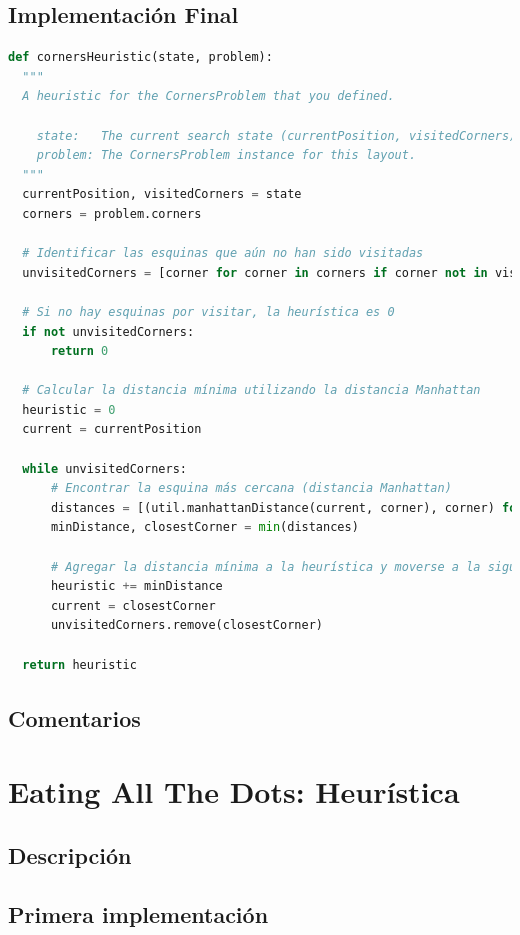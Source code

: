 \documentclass{report}
\begin{document}
        \subsection*{Implementación Final}
          \begin{lstlisting}[language=Python, caption=Implementación final de la heurística del problema de las esquinas]
def cornersHeuristic(state, problem):
  """
  A heuristic for the CornersProblem that you defined.

    state:   The current search state (currentPosition, visitedCorners)
    problem: The CornersProblem instance for this layout.
  """
  currentPosition, visitedCorners = state
  corners = problem.corners

  # Identificar las esquinas que aún no han sido visitadas
  unvisitedCorners = [corner for corner in corners if corner not in visitedCorners]

  # Si no hay esquinas por visitar, la heurística es 0
  if not unvisitedCorners:
      return 0

  # Calcular la distancia mínima utilizando la distancia Manhattan
  heuristic = 0
  current = currentPosition

  while unvisitedCorners:
      # Encontrar la esquina más cercana (distancia Manhattan)
      distances = [(util.manhattanDistance(current, corner), corner) for corner in unvisitedCorners]
      minDistance, closestCorner = min(distances)
      
      # Agregar la distancia mínima a la heurística y moverse a la siguiente esquina
      heuristic += minDistance
      current = closestCorner
      unvisitedCorners.remove(closestCorner)

  return heuristic
          \end{lstlisting}
        \subsection*{Comentarios}
      \clearpage\section{Eating All The Dots: Heurística}
        \subsection*{Descripción}
        \subsection*{Primera implementación}
          \begin{lstlisting}[language=Python, caption=Implementación inicial de la heurística del problema de las esquinas]
          \end{lstlisting}
\end{document}
